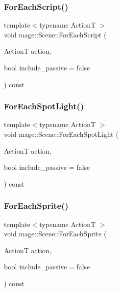 \hypertarget{classmage_1_1_scene_a217ee5824ebed8465c91706ef551edcc}{}\label{classmage_1_1_scene_a217ee5824ebed8465c91706ef551edcc} 
\subsubsection{\texorpdfstring{For\+Each\+Script()}{ForEachScript()}}
{\footnotesize\ttfamily template$<$typename ActionT $>$ \\
void mage\+::\+Scene\+::\+For\+Each\+Script (\begin{DoxyParamCaption}\item[{ActionT}]{action,  }\item[{bool}]{include\+\_\+passive = {\ttfamily false} }\end{DoxyParamCaption}) const}

\hypertarget{classmage_1_1_scene_af7419b0edf8a0cae6b113d18231a910a}{}\label{classmage_1_1_scene_af7419b0edf8a0cae6b113d18231a910a} 
\subsubsection{\texorpdfstring{For\+Each\+Spot\+Light()}{ForEachSpotLight()}}
{\footnotesize\ttfamily template$<$typename ActionT $>$ \\
void mage\+::\+Scene\+::\+For\+Each\+Spot\+Light (\begin{DoxyParamCaption}\item[{ActionT}]{action,  }\item[{bool}]{include\+\_\+passive = {\ttfamily false} }\end{DoxyParamCaption}) const}

\hypertarget{classmage_1_1_scene_af33b14f081e0b3ae5dafc807bb6bf5b4}{}\label{classmage_1_1_scene_af33b14f081e0b3ae5dafc807bb6bf5b4} 
\subsubsection{\texorpdfstring{For\+Each\+Sprite()}{ForEachSprite()}}
{\footnotesize\ttfamily template$<$typename ActionT $>$ \\
void mage\+::\+Scene\+::\+For\+Each\+Sprite (\begin{DoxyParamCaption}\item[{ActionT}]{action,  }\item[{bool}]{include\+\_\+passive = {\ttfamily false} }\end{DoxyParamCaption}) const}

